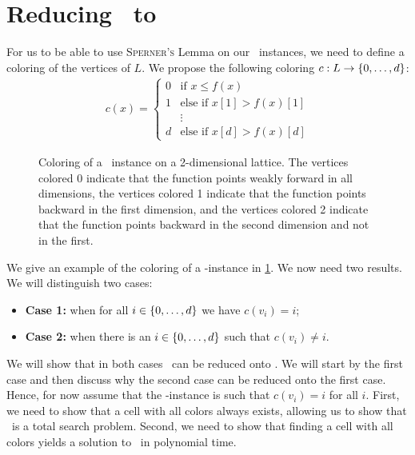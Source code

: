 \section{Reducing \Tarskistar\ to \Sperner}\label{sec:tarskistar_to_sperner}

For us to be able to use \textsc{Sperner's} Lemma on our \Tarskistar\ instances, we need to define a coloring of the vertices of $L$. We propose the following coloring $c : L \rightarrow \left\{0, \dots, d\right\}$:
\begin{align*}
	c(x) =
	\begin{cases}
		0 & \text{if $x \leq f(x)$}         \\
		1 & \text{else if $x[1] > f(x)[1]$} \\
		  & \vdots                          \\
		d & \text{else if $x[d] > f(x)[d]$}
	\end{cases}
\end{align*}

\begin{figure}[ht]
	\centering
	\caption[Coloring of a \Tarskistar-instance]{Coloring of a \Tarskistar\ instance on a 2-dimensional lattice. The vertices colored 0 indicate that the function points weakly forward in all dimensions, the vertices colored 1 indicate that the function points backward in the first dimension, and the vertices colored 2 indicate that the function points backward in the second dimension and not in the first.}\label{fig:tarskistar_coloring}
\end{figure}

We give an example of the coloring of a \Tarski-instance in \cref{fig:tarskistar_coloring}. We now need two results. We will distinguish two cases:
\begin{itemize}
	\item \textbf{Case 1:} when for all $i \in \left\{0, \dots, d\right\}$ we have $c(v_i) = i$;
	\item \textbf{Case 2:} when there is an $i \in \left\{0, \dots, d\right\}$ such that $c(v_i) \neq i$.
\end{itemize}
We will show that in both cases \Tarskistar\ can be reduced onto \Sperner. We will start by the first case and then discuss why the second case can be reduced onto the first case. Hence, for now assume that the \Tarskistar-instance is such that $c(v_i) = i$ for all $i$. First, we need to show that a cell with all colors always exists, allowing us to show that \Tarskistar\ is a total search problem. Second, we need to show that finding a cell with all colors yields a solution to \Tarskistar\ in polynomial time.

